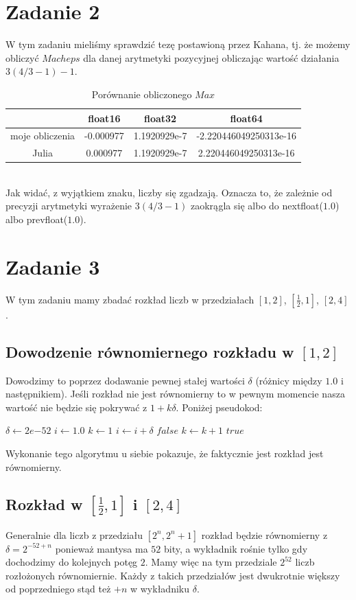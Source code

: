 \documentclass{article}
\begin{document}
\section*{Zadanie 2}
W tym zadaniu mieliśmy sprawdzić tezę postawioną przez Kahana, tj. że możemy obliczyć
$Macheps$ dla danej arytmetyki pozycyjnej obliczając wartość działania $3(4/3 - 1) - 1$.
\begin{table}[h]
    \centering
    \begin{tabular}{|c|c|c|c|}
      \hline
      & float16 & float32 & float64 \\
      \hline
      moje obliczenia &-0.000977&1.1920929e-7&-2.220446049250313e-16\\
      \hline
      Julia &0.000977&1.1920929e-7&2.220446049250313e-16\\
      \hline
    \end{tabular}
    \caption{Porównanie obliczonego $Max$}
  \end{table}\\
Jak widać, z wyjątkiem znaku, liczby się zgadzają. Oznacza to, że
zależnie od precyzji arytmetyki wyrażenie $3(4/3-1)$ zaokrągla się
albo do nextfloat($1.0$) albo prevfloat($1.0$).


\section*{Zadanie 3}
W tym zadaniu mamy zbadać rozkład liczb w przedziałach $[1,2]$,
$[\frac{1}{2}, 1]$, $[2,4]$.
\subsection*{Dowodzenie równomiernego rozkładu w $[1,2]$}
Dowodzimy to poprzez dodawanie pewnej stałej wartości $\delta$ (różnicy między $1.0$ i następnikiem).
Jeśli rozkład nie jest równomierny to w pewnym momencie nasza wartość nie będzie się pokrywać
z $1+k\delta$. Poniżej pseudokod:
\begin{algorithmic}
        \State $\delta \gets 2e{-52}$
        \State $i \gets 1.0$
        \State $k \gets 1$
            \State $i \gets i + \delta$
                \Return $false$
            \EndIf 
            \State $k \gets k + 1$
        \EndWhile
        \State \Return $true$
    \EndProcedure
    \end{algorithmic}
Wykonanie tego algorytmu u siebie pokazuje, że faktycznie jest rozkład
jest równomierny.
\subsection*{Rozkład w $[\frac{1}{2}, 1]$ i $[2,4]$}
Generalnie dla liczb z przedziału $[2^n, 2^n+1]$ rozkład będzie
równomierny z $\delta = 2^{-52 + n}$ ponieważ mantysa ma $52$ bity, a
wykładnik rośnie tylko gdy dochodzimy do kolejnych potęg $2$. Mamy więc
na tym przedziale $2^{52}$ liczb rozłożonych równomiernie. Każdy z takich przedziałów
jest dwukrotnie większy od poprzedniego stąd też $+n$ w wykładniku $\delta$.
\end{document}
